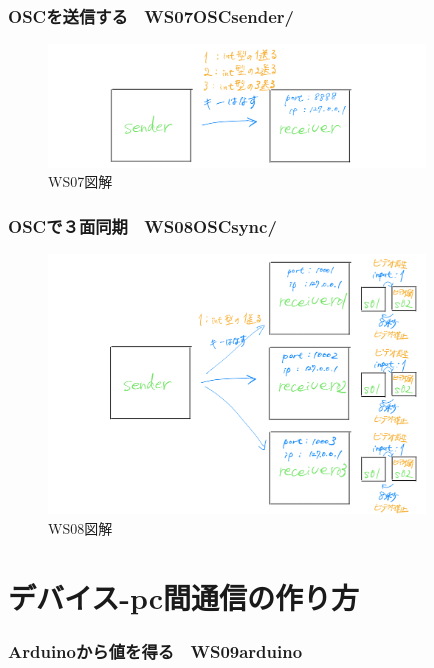 \documentclass[10pt, dvipdfmx]{beamer}
\begin{document}
        \begin{frame}
            \frametitle{OSCを送信する　WS07OSCsender/}
                \begin{figure}[htb]
                    \includegraphics[width=100mm]{images/ws06-1.png}
                    \caption{WS07図解}
                    \label{fig:04}
                \end{figure}
        \end{frame}

        \begin{frame}
            \frametitle{OSCで３面同期　WS08OSCsync/}
                \begin{figure}[htb]
                    \includegraphics[width=100mm]{images/ws08-1.png}
                    \caption{WS08図解}
                    \label{fig:05}
                \end{figure}
        \end{frame}

    \section{デバイス-pc間通信の作り方}
        \frametitle{Arduinoから値を得る　WS09arduino}
        \begin{frame}
        \end{frame}
\end{document}
